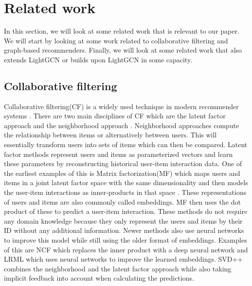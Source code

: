 \section{Related work}
In this section, we will look at some related work that is relevant to our paper.
We will start by looking at some work related to collaborative filtering and graph-based recommenders.
Finally, we will look at some related work that also extends LightGCN or builds upon LightGCN in some capacity.

\subsection{Collaborative filtering}
Collaborative filtering(CF) is a widely used technique in modern recommender systems \cite{lightgcn}.
There are two main disciplines of CF which are the latent factor approach and the neighborhood approach \cite{SVD}.
Neighborhood approaches compute the relationship between items or alternatively between users.
This will essentially transform users into sets of items which can then be compared.
Latent factor methods represent users and items as parameterized vectors and learn these parameters by reconstructing historical user-item interaction data.
One of the earliest examples of this is Matrix factorization(MF) which maps users and items in a joint latent factor space with the same dimensionality and then models the user-item interactions as inner-products in that space \cite{Matrix-factorization-techniques}.
These representations of users and items are also commonly called embeddings.
MF then uses the dot product of these to predict a user-item interaction.
These methods do not require any domain knowledge because they only represent the users and items by their ID without any additional information.
Newer methods also use neural networks to improve this model while still using the older format of embeddings. 
Examples of this are NCF \cite{NCF} which replaces the inner product with a deep neural network and LRML\cite{LRML} which uses neural networks to improve the learned embeddings.
SVD++ \cite{SVD} combines the neighborhood and the latent factor approach while also taking implicit feedback into account when calculating the predictions.


